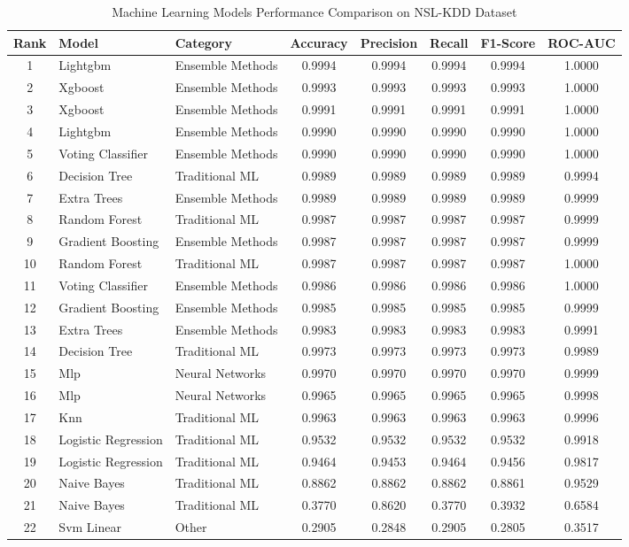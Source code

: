 \begin{table}[htbp]
\centering
\caption{Machine Learning Models Performance Comparison on NSL-KDD Dataset}
\label{tab:model_performance}
\begin{tabular}{cllccccc}
\toprule
\textbf{Rank} & \textbf{Model} & \textbf{Category} & \textbf{Accuracy} & \textbf{Precision} & \textbf{Recall} & \textbf{F1-Score} & \textbf{ROC-AUC} \\
\midrule
1 & Lightgbm & Ensemble Methods & 0.9994 & 0.9994 & 0.9994 & 0.9994 & 1.0000 \\
2 & Xgboost & Ensemble Methods & 0.9993 & 0.9993 & 0.9993 & 0.9993 & 1.0000 \\
3 & Xgboost & Ensemble Methods & 0.9991 & 0.9991 & 0.9991 & 0.9991 & 1.0000 \\
4 & Lightgbm & Ensemble Methods & 0.9990 & 0.9990 & 0.9990 & 0.9990 & 1.0000 \\
5 & Voting Classifier & Ensemble Methods & 0.9990 & 0.9990 & 0.9990 & 0.9990 & 1.0000 \\
6 & Decision Tree & Traditional ML & 0.9989 & 0.9989 & 0.9989 & 0.9989 & 0.9994 \\
7 & Extra Trees & Ensemble Methods & 0.9989 & 0.9989 & 0.9989 & 0.9989 & 0.9999 \\
8 & Random Forest & Traditional ML & 0.9987 & 0.9987 & 0.9987 & 0.9987 & 0.9999 \\
9 & Gradient Boosting & Ensemble Methods & 0.9987 & 0.9987 & 0.9987 & 0.9987 & 0.9999 \\
10 & Random Forest & Traditional ML & 0.9987 & 0.9987 & 0.9987 & 0.9987 & 1.0000 \\
\midrule
11 & Voting Classifier & Ensemble Methods & 0.9986 & 0.9986 & 0.9986 & 0.9986 & 1.0000 \\
12 & Gradient Boosting & Ensemble Methods & 0.9985 & 0.9985 & 0.9985 & 0.9985 & 0.9999 \\
13 & Extra Trees & Ensemble Methods & 0.9983 & 0.9983 & 0.9983 & 0.9983 & 0.9991 \\
14 & Decision Tree & Traditional ML & 0.9973 & 0.9973 & 0.9973 & 0.9973 & 0.9989 \\
15 & Mlp & Neural Networks & 0.9970 & 0.9970 & 0.9970 & 0.9970 & 0.9999 \\
16 & Mlp & Neural Networks & 0.9965 & 0.9965 & 0.9965 & 0.9965 & 0.9998 \\
17 & Knn & Traditional ML & 0.9963 & 0.9963 & 0.9963 & 0.9963 & 0.9996 \\
18 & Logistic Regression & Traditional ML & 0.9532 & 0.9532 & 0.9532 & 0.9532 & 0.9918 \\
19 & Logistic Regression & Traditional ML & 0.9464 & 0.9453 & 0.9464 & 0.9456 & 0.9817 \\
20 & Naive Bayes & Traditional ML & 0.8862 & 0.8862 & 0.8862 & 0.8861 & 0.9529 \\
\midrule
21 & Naive Bayes & Traditional ML & 0.3770 & 0.8620 & 0.3770 & 0.3932 & 0.6584 \\
22 & Svm Linear & Other & 0.2905 & 0.2848 & 0.2905 & 0.2805 & 0.3517 \\
\bottomrule
\end{tabular}
\end{table}

